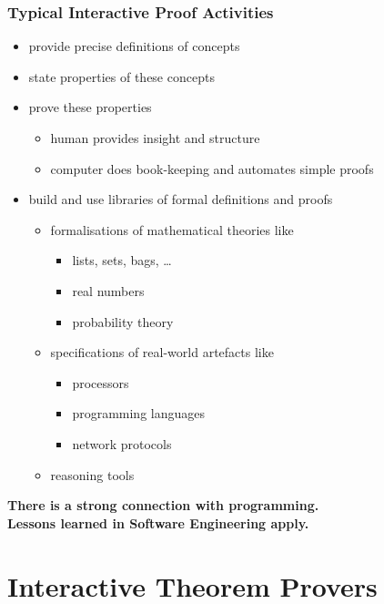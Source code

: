 \begin{frame}
\frametitle{Typical Interactive Proof Activities}

\begin{itemize}
\item provide precise definitions of concepts
\item state properties of these concepts
\item prove these properties
\begin{itemize}
\item human provides insight and structure
\item computer does book-keeping and automates simple proofs
\end{itemize}
\item build and use libraries of formal definitions and proofs
\begin{itemize}
\item formalisations of mathematical theories like
\begin{itemize}
\item lists, sets, bags, \ldots
\item real numbers
\item probability theory
\end{itemize}
\item specifications of real-world artefacts like 
\begin{itemize}
\item processors
\item programming languages
\item network protocols
\end{itemize}
\item reasoning tools
\end{itemize}
\end{itemize}

\begin{center}
\textbf{There is a strong connection with programming.\\Lessons learned in Software Engineering apply.}
\end{center}
\end{frame}


\section{Interactive Theorem Provers}

